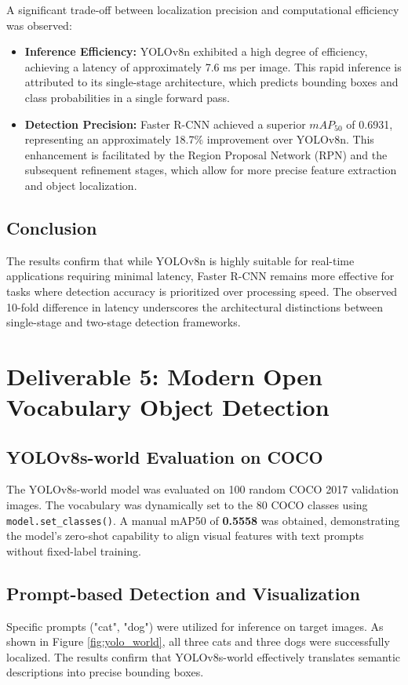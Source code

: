 \documentclass[11pt]{article}
\begin{document}
A significant trade-off between localization precision and computational efficiency was observed:
\begin{itemize}
    \item \textbf{Inference Efficiency:} YOLOv8n exhibited a high degree of efficiency, achieving a latency of approximately 7.6 ms per image. This rapid inference is attributed to its single-stage architecture, which predicts bounding boxes and class probabilities in a single forward pass.
    \item \textbf{Detection Precision:} Faster R-CNN achieved a superior $mAP_{50}$ of 0.6931, representing an approximately 18.7\% improvement over YOLOv8n. This enhancement is facilitated by the Region Proposal Network (RPN) and the subsequent refinement stages, which allow for more precise feature extraction and object localization.
\end{itemize}

\subsection{Conclusion}
The results confirm that while YOLOv8n is highly suitable for real-time applications requiring minimal latency, Faster R-CNN remains more effective for tasks where detection accuracy is prioritized over processing speed. The observed 10-fold difference in latency underscores the architectural distinctions between single-stage and two-stage detection frameworks.

\clearpage
\section{Deliverable 5: Modern Open Vocabulary Object Detection}

\subsection{YOLOv8s-world Evaluation on COCO}
The YOLOv8s-world model was evaluated on 100 random COCO 2017 validation images. The vocabulary was dynamically set to the 80 COCO classes using \texttt{model.set\_classes()}. A manual mAP50 of \textbf{0.5558} was obtained, demonstrating the model's zero-shot capability to align visual features with text prompts without fixed-label training.

\subsection{Prompt-based Detection and Visualization}
Specific prompts ("cat", "dog") were utilized for inference on target images. As shown in Figure \ref{fig:yolo_world}, all three cats and three dogs were successfully localized. The results confirm that YOLOv8s-world effectively translates semantic descriptions into precise bounding boxes.
\end{document}
